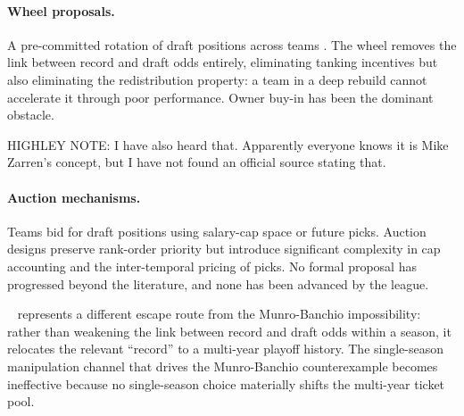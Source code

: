 \paragraph{Wheel proposals.} A pre-committed rotation of draft positions across teams \citep{highley2026solvable1}. The wheel removes the link between record and draft odds entirely, eliminating tanking incentives but also eliminating the redistribution property: a team in a deep rebuild cannot accelerate it through poor performance. Owner buy-in has been the dominant obstacle. 

HIGHLEY NOTE: I have also heard that. Apparently everyone knows it is Mike Zarren's concept, but I have not found an official source stating that.

\paragraph{Auction mechanisms.} Teams bid for draft positions using salary-cap space or future picks. Auction designs preserve rank-order priority but introduce significant complexity in cap accounting and the inter-temporal pricing of picks. No formal proposal has progressed beyond the literature, and none has been advanced by the league.

\cola{}~\citep{highley2026cola} represents a different escape route from the Munro-Banchio impossibility: rather than weakening the link between record and draft odds within a season, it relocates the relevant ``record'' to a multi-year playoff history. The single-season manipulation channel that drives the Munro-Banchio counterexample becomes ineffective because no single-season choice materially shifts the multi-year ticket pool.
